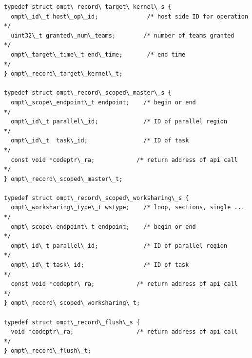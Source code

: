 \documentclass{article}
\begin{document}
\begin{boxedcode}
\begin{verbatim}
typedef struct ompt\_record\_target\_kernel\_s {
  ompt\_id\_t host\_op\_id;              /* host side ID for operation  */
  uint32\_t granted\_num\_teams;        /* number of teams granted     */
  ompt\_target\_time\_t end\_time;       /* end time                    */
} ompt\_record\_target\_kernel\_t;

typedef struct ompt\_record\_scoped\_master\_s {
  ompt\_scope\_endpoint\_t endpoint;    /* begin or end                */
  ompt\_id\_t parallel\_id;             /* ID of parallel region       */
  ompt\_id\_t  task\_id;                /* ID of task                  */
  const void *codeptr\_ra;            /* return address of api call  */
} ompt\_record\_scoped\_master\_t;

typedef struct ompt\_record\_scoped\_worksharing\_s {
  ompt\_worksharing\_type\_t wstype;    /* loop, sections, single ...  */
  ompt\_scope\_endpoint\_t endpoint;    /* begin or end                */
  ompt\_id\_t parallel\_id;             /* ID of parallel region       */
  ompt\_id\_t task\_id;                 /* ID of task                  */
  const void *codeptr\_ra;            /* return address of api call  */
} ompt\_record\_scoped\_worksharing\_t;

typedef struct ompt\_record\_flush\_s {
  void *codeptr\_ra;                  /* return address of api call  */
} ompt\_record\_flush\_t;


\end{verbatim}
\end{boxedcode}
\end{document}
